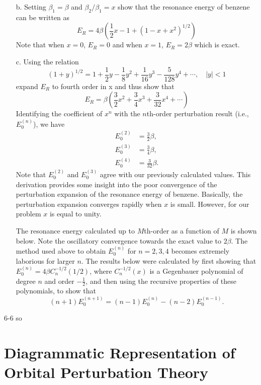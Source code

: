 \documentclass[a4paper]{book}
\begin{document}
\begin{exercise}
\begin{enumerate}
	\item[b.] Setting $\beta_1 = \beta$ and $\beta_2/\beta_1=x$ show that the resonance energy of benzene can be written as
	\[
		E_R = 4 \beta ( \frac{1}{2}x - 1 + (1-x+x^2)^{1/2})
	\]
	Note that when $x=0$, $E_R=0$ and when $x=1$, $E_R=2\beta$ which is exact.
	
	\item[c.] Using the relation
	\[
		(1 + y)^{1/2} = 1 + \frac{1}{2} y - \frac{1}{8}y^2 + \frac{1}{16} y^3 - \frac{5}{128}y^4 + \cdots , \quad |y|<1
	\]	
	expand $E_R$ to fourth order in x and thus show that
	\[
		E_R = \beta ( \frac{3}{2}x^2 + \frac{3}{4} x^3 + \frac{3}{32}x^4 + \cdots )
	\]
	Identifying the coefficient of $x^n$ with the $n$th-order perturbation result (i.e., $E^(n)_0$), we have
	\begin{align*}
		E^{(2)}_0 &= \frac{3}{2} \beta, \\
		E^{(3)}_0 &= \frac{3}{4} \beta, \\
		E^{(4)}_0 &= \frac{3}{32} \beta.
	\end{align*}
	Note that $E^{(2)}_0$ and $E^{(3)}_0$ agree with our previously calculated values. This derivation provides some insight into the poor convergence of the perturbation expansion of the resonance energy of benzene. Basically, the perturbation expansion converges rapidly when $x$ is small. However, for our problem $x$ is equal to unity.
	
	The resonance energy calculated up to $M$th-order as a function of $M$ is shown below. Note the oscillatory convergence towards the exact value to $2\beta$. The method used above to obtain $E^{(n)}_0$ for $n=2,3,4$ becomes extremely laborious for larger $n$. The results below were calculated by first showing that $E^{(n)}_0 = 4\beta C^{-1/2}_n(1/2)$, where $C^{-1/2}_n(x)$ is a Gegenbauer polynomial of degree $n$ and order $-\frac{1}{2}$, and then using the recursive properties of these polynomials, to show that
	\[
		(n+1)E^{(n+1)}_0 = (n-1) E^{(n)}_0 - (n-2) E^{(n-1)}_0.
	\]
	
	
	\end{enumerate}
	
	\end{exercise}
	
	\begin{solution}
		6-6 so
	\end{solution}
	
	\section{Diagrammatic Representation of Orbital Perturbation Theory}
	
\end{document}
